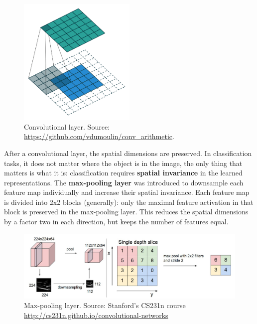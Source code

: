 \documentclass[
  letterpaper,
  DIV=11,
  numbers=noendperiod]{scrreprt}
\begin{document}
\begin{figure}

{\centering \includegraphics[width=0.5\textwidth,height=\textheight]{./img/convlayer.gif}

}

\caption{\label{fig-convlayer}Convolutional layer. Source:
\url{https://github.com/vdumoulin/conv_arithmetic}.}

\end{figure}

After a convolutional layer, the spatial dimensions are preserved. In
classification tasks, it does not matter where the object is in the
image, the only thing that matters is what it is: classification
requires \textbf{spatial invariance} in the learned representations. The
\textbf{max-pooling layer} was introduced to downsample each feature map
individually and increase their spatial invariance. Each feature map is
divided into 2x2 blocks (generally): only the maximal feature activation
in that block is preserved in the max-pooling layer. This reduces the
spatial dimensions by a factor two in each direction, but keeps the
number of features equal.

\begin{figure}

{\centering \includegraphics{./img/maxpooling.png}

}

\caption{\label{fig-maxpooling}Max-pooling layer. Source: Stanford's
CS231n course \url{http://cs231n.github.io/convolutional-networks}}

\end{figure}
\end{document}
